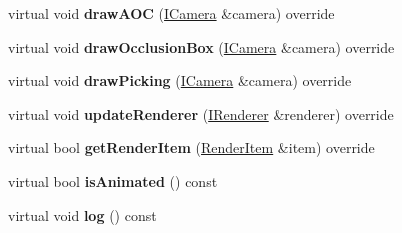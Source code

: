 \begin{DoxyCompactItemize}
\item 
virtual void {\bfseries draw\+A\+OC} (\hyperlink{classflw_1_1flf_1_1ICamera}{I\+Camera} \&camera) override\hypertarget{classflw_1_1flf_1_1Entity_a147efc00f87398f5fee13206fdc1c161}{}\label{classflw_1_1flf_1_1Entity_a147efc00f87398f5fee13206fdc1c161}

\item 
virtual void {\bfseries draw\+Occlusion\+Box} (\hyperlink{classflw_1_1flf_1_1ICamera}{I\+Camera} \&camera) override\hypertarget{classflw_1_1flf_1_1Entity_a873a0fa0930c5ac7e1b99011f024a87b}{}\label{classflw_1_1flf_1_1Entity_a873a0fa0930c5ac7e1b99011f024a87b}

\item 
virtual void {\bfseries draw\+Picking} (\hyperlink{classflw_1_1flf_1_1ICamera}{I\+Camera} \&camera) override\hypertarget{classflw_1_1flf_1_1Entity_a58d2d7a158a3f51a507e2c3346c22e91}{}\label{classflw_1_1flf_1_1Entity_a58d2d7a158a3f51a507e2c3346c22e91}

\item 
virtual void {\bfseries update\+Renderer} (\hyperlink{classflw_1_1flf_1_1IRenderer}{I\+Renderer} \&renderer) override\hypertarget{classflw_1_1flf_1_1Entity_a469575479f34a7113331126bd6baee8f}{}\label{classflw_1_1flf_1_1Entity_a469575479f34a7113331126bd6baee8f}

\item 
virtual bool {\bfseries get\+Render\+Item} (\hyperlink{structflw_1_1flf_1_1RenderItem}{Render\+Item} \&item) override\hypertarget{classflw_1_1flf_1_1Entity_a401249745279bc6c62814a50a9ce3ee9}{}\label{classflw_1_1flf_1_1Entity_a401249745279bc6c62814a50a9ce3ee9}

\item 
virtual bool {\bfseries is\+Animated} () const \hypertarget{classflw_1_1flf_1_1Entity_a3f87ebe6d12d0d96339c9e4c81547d30}{}\label{classflw_1_1flf_1_1Entity_a3f87ebe6d12d0d96339c9e4c81547d30}

\item 
virtual void {\bfseries log} () const \hypertarget{classflw_1_1flf_1_1Entity_aea89e4213cc9ee272c188a27cd2360da}{}\label{classflw_1_1flf_1_1Entity_aea89e4213cc9ee272c188a27cd2360da}

\end{DoxyCompactItemize}
